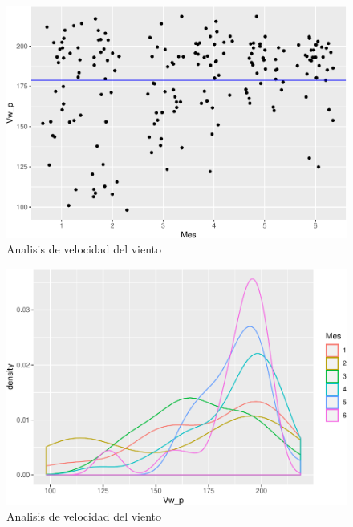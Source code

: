 \documentclass[conference,final,]{IEEEtran}
\makeatletter
\def\maxwidth{\ifdim\Gin@nat@width>\linewidth\linewidth
\else\Gin@nat@width\fi}
\let\Oldincludegraphics\includegraphics
\renewcommand{\includegraphics}[1]{\Oldincludegraphics[width=\maxwidth]{#1}}
\makeatother
\begin{document}
\begin{figure}
\centering
\includegraphics{Hidrology_files/figure-latex/unnamed-chunk-9-1.pdf}
\caption{Analisis de velocidad del viento}
\end{figure}

\begin{figure}
\centering
\includegraphics{Hidrology_files/figure-latex/unnamed-chunk-10-1.pdf}
\caption{Analisis de velocidad del viento}
\end{figure}
\end{document}
